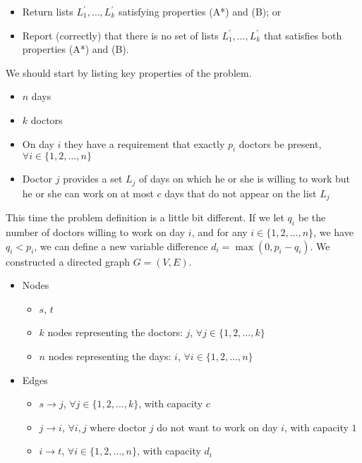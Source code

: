 \begin{itemize}
\item Return lists $L_{1}^{\prime}, \ldots, L_{k}^{\prime}$ satisfying properties (A*) and (B); or
\item Report (correctly) that there is no set of lists $L_{1}^{\prime}, \ldots, L_{k}^{\prime}$ that satisfies both properties (A*) and (B).
\end{itemize}



We should start by listing key properties of the problem.

\begin{itemize}
\item $n$ days
\item $k$ doctors 
\item On day $i$ they have a requirement that exactly $p_i$ doctors be present, $\forall i \in \{1, 2, \dots, n\}$
\item Doctor $j$ provides a set $L_j$ of days on which he or she is willing to work but he or she can work on at most $c$ days that do not appear on the list $L_j$
\end{itemize}

This time the problem definition is a little bit different. If we let $q_i$ be the number of doctors willing to work on day $i$, and for any $i \in \{1, 2, \dots, n\}$, we have $q_i < p_i$, we can define a new variable difference $d_i = \max(0, p_i - q_i)$. We constructed a directed graph $G=(V,E)$.

\begin{itemize}
\item Nodes
	\begin{itemize}
		\item $s$, $t$
		\item $k$ nodes representing the doctors: $j$, $\forall j \in \{1, 2, \dots, k\}$
		\item $n$ nodes representing the days: $i$, $\forall i \in \{1, 2, \dots, n\}$
	\end{itemize}
\item Edges
	\begin{itemize}
		\item $s \rightarrow j$, $\forall j \in \{1, 2, \dots, k\}$, with capacity $c$
		\item $j \rightarrow i$, $\forall i, j$ where doctor $j$ do not want to work on day $i$, with capacity $1$
		\item $i \rightarrow t$, $\forall i \in \{1, 2, \dots, n\}$, with capacity $d_i$
	\end{itemize}
\end{itemize}

